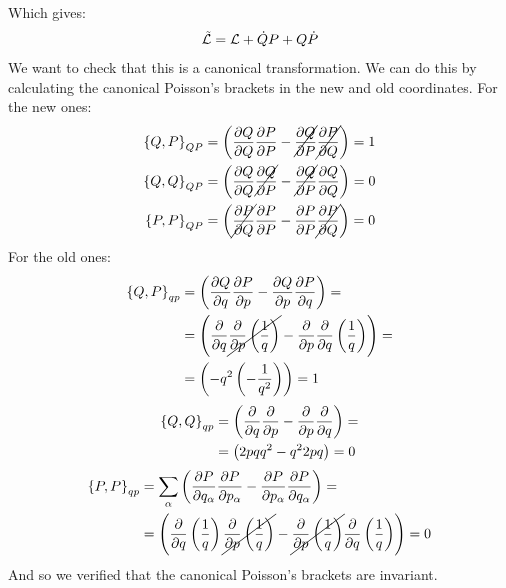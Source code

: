 Which gives:
\begin{equation}
    \tilde{\mathcal{L}} = \mathcal{L} + \dot{Q}P + Q\dot{P}
\end{equation}
We want to check that this is a canonical transformation. We can do this by calculating the canonical Poisson's brackets in the new and old coordinates. For the new ones:
\begin{equation}
    \begin{split}
        \pb{Q}{P}_{QP} &= \left(\pdv{Q}{Q} \pdv{P}{P} - \cancel{\pdv{Q}{P}} \cancel{\pdv{P}{Q}} \right) = 1\\
        \pb{Q}{Q}_{QP} &= \left(\pdv{Q}{Q} \cancel{\pdv{Q}{P}} - \cancel{\pdv{Q}{P}} \pdv{Q}{Q} \right) = 0\\
        \pb{P}{P}_{QP} &= \left(\cancel{\pdv{P}{Q}} \pdv{P}{P}  -  \pdv{P}{P} \cancel{\pdv{P}{Q}}\right) = 0
    \end{split}
\end{equation}
For the old ones:
\begin{equation}
    \begin{split}
        \pb{Q}{P}_{qp} &= \left(\pdv{Q}{q} \pdv{P}{p} - \pdv{Q}{p} \pdv{P}{q} \right) = \\
        &= \left(\pdv{}{q}(pq^2) \cancel{\pdv{}{p}\left(\dfrac{1}{q}\right)} - \pdv{}{p}(pq^2) \pdv{}{q}\left(\dfrac{1}{q}\right) \right) = \\
        &= \left(- q^2  \left(-\dfrac{1}{q^2}\right) \right) = 1
    \end{split}
\end{equation}
\begin{equation}
    \begin{split}
        \pb{Q}{Q}_{qp} &= \left(\pdv{}{q}(pq^2) \pdv{}{p}(pq^2) - \pdv{}{p}(pq^2) \pdv{}{q}(pq^2) \right) = \\
        &= \left(2pq  q^2 - q^2  2pq \right) = 0
    \end{split}
\end{equation}
\begin{equation}
    \begin{split}
        \pb{P}{P}_{qp} &= \bigsum_{\alpha} \left(\pdv{P}{q_{\alpha}} \pdv{P}{p_{\alpha}} - \pdv{P}{p_{\alpha}} \pdv{P}{q_{\alpha}} \right) = \\
        &= \left(\pdv{}{q}\left(\dfrac{1}{q}\right) \cancel{\pdv{}{p}\left(\dfrac{1}{q}\right)} - \cancel{\pdv{}{p}\left(\dfrac{1}{q}\right)} \pdv{}{q}\left(\dfrac{1}{q}\right) \right) = 0
    \end{split}
\end{equation}
And so we verified that the canonical Poisson's brackets are invariant.
